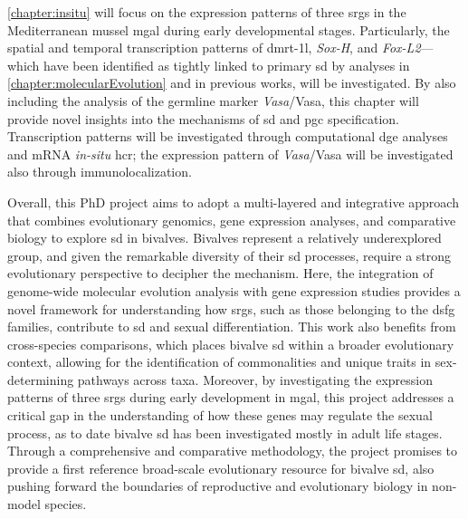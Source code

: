 \cref{chapter:insitu} will focus on the expression patterns of three \glspl{srg} in the Mediterranean mussel \gls{mgal} during early developmental stages. Particularly, the spatial and temporal transcription patterns of \gls{dmrt-1l}, \textit{Sox-H}, and \textit{Fox-L2}---which have been identified as tightly linked to primary \gls{sd} by analyses in \cref{chapter:molecularEvolution} and in previous works, will be investigated. By also including the analysis of the germline marker \textit{Vasa}/Vasa, this chapter will provide novel insights into the mechanisms of \gls{sd} and \gls{pgc} specification. Transcription patterns will be investigated through computational \gls{dge} analyses and mRNA \textit{in-situ} \gls{hcr}; the expression pattern of \textit{Vasa}/Vasa will be investigated also through immunolocalization.

Overall, this PhD project aims to adopt a multi-layered and integrative approach that combines evolutionary genomics, gene expression analyses, and comparative biology to explore \gls{sd} in bivalves. Bivalves represent a relatively underexplored group, and given the remarkable diversity of their \gls{sd} processes, require a strong evolutionary perspective to decipher the mechanism. Here, the integration of genome-wide molecular evolution analysis with gene expression studies provides a novel framework for understanding how \glspl{srg}, such as those belonging to the \gls{dsfg} families, contribute to \gls{sd} and sexual differentiation. This work also benefits from cross-species comparisons, which places bivalve \gls{sd} within a broader evolutionary context, allowing for the identification of commonalities and unique traits in sex-determining pathways across taxa. Moreover, by investigating the expression patterns of three \glspl{srg} during early development in \gls{mgal}, this project addresses a critical gap in the understanding of how these genes may regulate the sexual process, as to date bivalve \gls{sd} has been investigated mostly in adult life stages. Through a comprehensive and comparative methodology, the project promises to provide a first reference broad-scale evolutionary resource for bivalve \gls{sd}, also pushing forward the boundaries of reproductive and evolutionary biology in non-model species.

